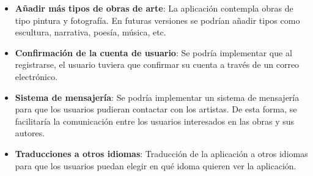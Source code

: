 \begin{itemize}
    \item \textbf{Añadir más tipos de obras de arte}: La aplicación contempla obras de tipo
    pintura y fotografía. En futuras versiones se podrían añadir tipos como escultura,
    narrativa, poesía, música, etc.
    \item \textbf{Confirmación de la cuenta de usuario}: Se podría implementar que al
    registrarse, el usuario tuviera que confirmar su cuenta a través de un correo electrónico.
    \item \textbf{Sistema de mensajería}: Se podría implementar un sistema de mensajería
    para que los usuarios pudieran contactar con los artistas. De esta forma, se facilitaría
    la comunicación entre los usuarios interesados en las obras y sus autores.
    \item \textbf{Traducciones a otros idiomas}: Traducción de la aplicación a otros idiomas
    para que los usuarios puedan elegir en qué idoma quieren ver la aplicación.
\end{itemize}